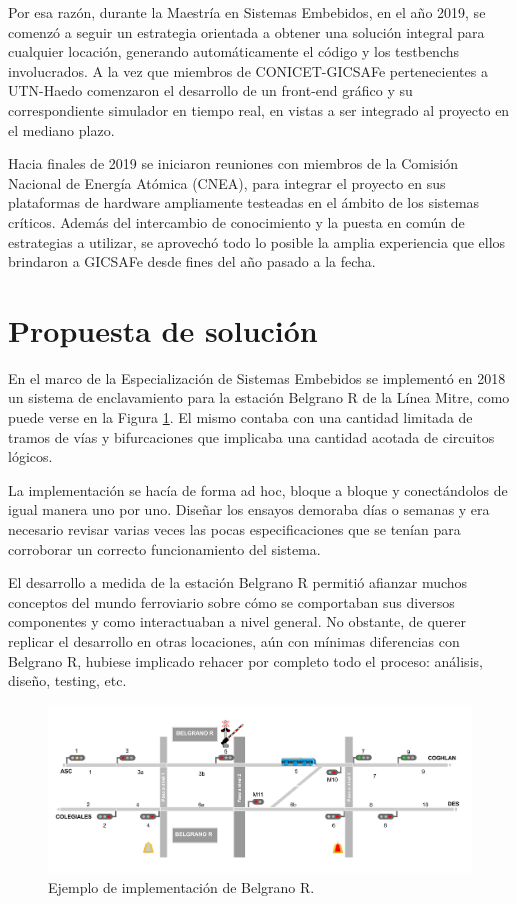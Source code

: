 		Por esa razón, durante la Maestría en Sistemas Embebidos, en el año 2019, se comenzó a seguir un estrategia orientada a obtener una solución integral para cualquier locación, generando automáticamente el código y los testbenchs involucrados. A la vez que miembros de CONICET-GICSAFe pertenecientes a UTN-Haedo comenzaron el desarrollo de un front-end gráfico y su correspondiente simulador en tiempo real, en vistas a ser integrado al proyecto en el mediano plazo.
	
		Hacia finales de 2019 se iniciaron reuniones con miembros de la Comisión Nacional de Energía Atómica (CNEA), para integrar el proyecto en sus plataformas de hardware ampliamente testeadas en el ámbito de los sistemas críticos. Además del intercambio de conocimiento y la puesta en común de estrategias a utilizar, se aprovechó todo lo posible la amplia experiencia que ellos brindaron a GICSAFe desde fines del año pasado a la fecha.
		
	\section{Propuesta de solución}	
		
		En el marco de la Especialización de Sistemas Embebidos se implementó en 2018 un sistema de enclavamiento para la estación Belgrano R de la Línea Mitre, como puede verse en la Figura \ref{fig:CESE_1}. El mismo contaba con una cantidad limitada de tramos de vías y bifurcaciones que implicaba una cantidad acotada de circuitos lógicos.%
		
		La implementación se hacía de forma ad hoc, bloque a bloque y conectándolos de igual manera uno por uno. Diseñar los ensayos demoraba días o semanas y era necesario revisar varias veces las pocas especificaciones que se tenían para corroborar un correcto funcionamiento del sistema.	
		
		El desarrollo a medida de la estación Belgrano R permitió afianzar muchos conceptos del mundo ferroviario sobre cómo se comportaban sus diversos componentes y como interactuaban a nivel general. No obstante, de querer replicar el desarrollo en otras locaciones, aún con mínimas diferencias con Belgrano R, hubiese implicado rehacer por completo todo el proceso: análisis, diseño, testing, etc.
		
		\begin{figure}[htbp!]
			\centering
			\includegraphics[scale=.27]{./Figures/Belgrano_R}
			\caption{Ejemplo de implementación de Belgrano R.}
			\label{fig:CESE_1}
		\end{figure}	
		

